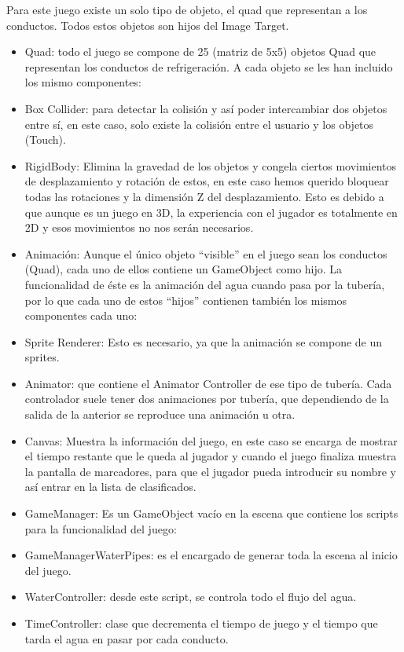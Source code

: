 Para este juego existe un solo tipo de objeto, el quad que representan a
los conductos. Todos estos objetos son hijos del Image Target.

\begin{itemize}
\item
  Quad: todo el juego se compone de 25 (matriz de 5x5) objetos Quad que
  representan los conductos de refrigeración. A cada objeto se les han
  incluido los mismo componentes:
\item
  Box Collider: para detectar la colisión y así poder intercambiar dos
  objetos entre sí, en este caso, solo existe la colisión entre el
  usuario y los objetos (Touch).
\item
  RigidBody: Elimina la gravedad de los objetos y congela ciertos
  movimientos de desplazamiento y rotación de estos, en este caso hemos
  querido bloquear todas las rotaciones y la dimensión Z del
  desplazamiento. Esto es debido a que aunque es un juego en 3D, la
  experiencia con el jugador es totalmente en 2D y esos movimientos no
  nos serán necesarios.
\item
  Animación: Aunque el único objeto ``visible'' en el juego sean los
  conductos (Quad), cada uno de ellos contiene un GameObject como hijo.
  La funcionalidad de éste es la animación del agua cuando pasa por la
  tubería, por lo que cada uno de estos ``hijos'' contienen también los
  mismos componentes cada uno:
\item
  Sprite Renderer: Esto es necesario, ya que la animación se compone de
  un sprites.
\item
  Animator: que contiene el Animator Controller de ese tipo de tubería.
  Cada controlador suele tener dos animaciones por tubería, que
  dependiendo de la salida de la anterior se reproduce una animación u
  otra.
\item
  Canvas: Muestra la información del juego, en este caso se encarga de
  mostrar el tiempo restante que le queda al jugador y cuando el juego
  finaliza muestra la pantalla de marcadores, para que el jugador pueda
  introducir su nombre y así entrar en la lista de clasificados.
\item
  GameManager: Es un GameObject vacío en la escena que contiene los
  scripts para la funcionalidad del juego:
\item
  GameManagerWaterPipes: es el encargado de generar toda la escena al
  inicio del juego.
\item
  WaterController: desde este script, se controla todo el flujo del
  agua.
\item
  TimeController: clase que decrementa el tiempo de juego y el tiempo
  que tarda el agua en pasar por cada conducto.
\end{itemize}

